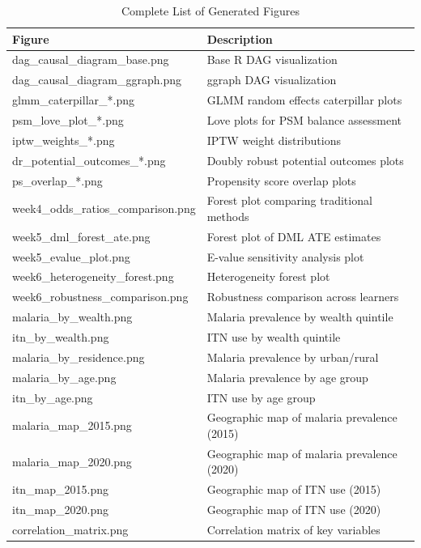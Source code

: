 \begin{table}[htbp]
	\centering
	\caption{Complete List of Generated Figures}
	\label{tab:appendix_figures}
	\begin{tabular}{@{}ll@{}}
		\toprule
		\textbf{Figure} & \textbf{Description} \\
		\midrule
		dag\_causal\_diagram\_base.png & Base R DAG visualization \\
		dag\_causal\_diagram\_ggraph.png & ggraph DAG visualization \\
		glmm\_caterpillar\_*.png & GLMM random effects caterpillar plots \\
		psm\_love\_plot\_*.png & Love plots for PSM balance assessment \\
		iptw\_weights\_*.png & IPTW weight distributions \\
		dr\_potential\_outcomes\_*.png & Doubly robust potential outcomes plots \\
		ps\_overlap\_*.png & Propensity score overlap plots \\
		week4\_odds\_ratios\_comparison.png & Forest plot comparing traditional methods \\
		week5\_dml\_forest\_ate.png & Forest plot of DML ATE estimates \\
		week5\_evalue\_plot.png & E-value sensitivity analysis plot \\
		week6\_heterogeneity\_forest.png & Heterogeneity forest plot \\
		week6\_robustness\_comparison.png & Robustness comparison across learners \\
		malaria\_by\_wealth.png & Malaria prevalence by wealth quintile \\
		itn\_by\_wealth.png & ITN use by wealth quintile \\
		malaria\_by\_residence.png & Malaria prevalence by urban/rural \\
		malaria\_by\_age.png & Malaria prevalence by age group \\
		itn\_by\_age.png & ITN use by age group \\
		malaria\_map\_2015.png & Geographic map of malaria prevalence (2015) \\
		malaria\_map\_2020.png & Geographic map of malaria prevalence (2020) \\
		itn\_map\_2015.png & Geographic map of ITN use (2015) \\
		itn\_map\_2020.png & Geographic map of ITN use (2020) \\
		correlation\_matrix.png & Correlation matrix of key variables \\
		\bottomrule
	\end{tabular}
\end{table}

